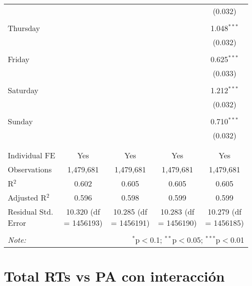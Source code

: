 \documentclass[
]{article}
\begin{document}
\begin{table}[!htbp]
{\begin{tabular}{@{\extracolsep{5pt}}lcccc}
  &  &  &  & (0.032) \\ 
  & & & & \\ 
 Thursday &  &  &  & 1.048$^{***}$ \\ 
  &  &  &  & (0.032) \\ 
  & & & & \\ 
 Friday &  &  &  & 0.625$^{***}$ \\ 
  &  &  &  & (0.033) \\ 
  & & & & \\ 
 Saturday &  &  &  & 1.212$^{***}$ \\ 
  &  &  &  & (0.032) \\ 
  & & & & \\ 
 Sunday &  &  &  & 0.710$^{***}$ \\ 
  &  &  &  & (0.032) \\ 
  & & & & \\ 
\hline \\[-1.8ex] 
Individual FE & Yes & Yes & Yes & Yes \\ 
Observations & 1,479,681 & 1,479,681 & 1,479,681 & 1,479,681 \\ 
R$^{2}$ & 0.602 & 0.605 & 0.605 & 0.605 \\ 
Adjusted R$^{2}$ & 0.596 & 0.598 & 0.599 & 0.599 \\ 
Residual Std. Error & 10.320 (df = 1456193) & 10.285 (df = 1456191) & 10.283 (df = 1456190) & 10.279 (df = 1456185) \\ 
\hline 
\hline \\[-1.8ex] 
\textit{Note:}  & \multicolumn{4}{r}{$^{*}$p$<$0.1; $^{**}$p$<$0.05; $^{***}$p$<$0.01} \\ 
\end{tabular}
} 
\end{table} 
\newpage
\section{Total RTs vs PA con interacción}
\end{document}
